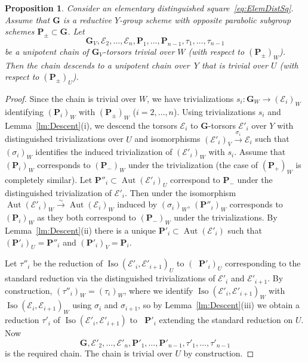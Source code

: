 \documentclass[11pt]{amsart}
\DeclareMathOperator\Ru{R_u}
\DeclareMathOperator{\Aut}{Aut}
\DeclareMathOperator{\Iso}{Iso}
\theoremstyle{plain}
\newtheorem{proposition}{Proposition}[section]
\theoremstyle{definition}
\theoremstyle{remark}
\newcommand\cE{{\mathcal{E}}}
\newcommand\bG{{\mathbf G}}
\newcommand\bP{{\mathbf P}}
\begin{document}
\begin{proposition}\label{pr:DescendChain}
Consider an elementary distinguished square~\eqref{eq:ElemDistSq}. Assume that $\bG$ is a reductive $Y$-group scheme with opposite parabolic subgroup schemes $\bP_\pm\subset\bG$. Let
\[
\bG_V,\cE_2,\ldots,\cE_n, \bP_1,\ldots,\bP_{n-1},\tau_1,\ldots,\tau_{n-1}
\]
be a unipotent chain of $\bG_V$-torsors trivial over $W$ (with respect to $(\bP_\pm)_W$). Then the chain descends to a unipotent chain over~$Y$ that is trivial over $U$ (with respect to $(\bP_\pm)_U$).
\end{proposition}
\begin{proof}
    Since the chain is trivial over $W$, we have trivializations $s_i\colon\bG_W\to(\cE_i)_W$ identifying $(\bP_i)_W$ with $(\bP_\pm)_W$ ($i=2,\ldots,n$). Using trivializations $s_i$ and Lemma~\ref{lm:Descent}(i), we descend the torsors $\cE_i$ to $\bG$-torsors $\cE'_i$ over $Y$ with distinguished trivializations over $U$ and isomorphisms $(\cE'_i)_V\xrightarrow{\sigma_i}\cE_i$ such that $(\sigma_i)_W$ identifies the induced trivialization of $(\cE'_i)_W$ with $s_i$. Assume that $(\bP_i)_W$ corresponds to $(\bP_-)_W$ under the trivialization (the case of $(\bP_+)_W$ is completely similar). Let $\bP''_i\subset\Aut(\cE'_i)_U$ correspond to $\bP_-$ under the distinguished trivialization of $\cE'_i$. Then under the isomorphism $\Aut(\cE'_i)_W\xrightarrow{\sim}\Aut(\cE_i)_W$ induced by $(\sigma_i)_W$,  $(\bP''_i)_W$ corresponds to $(\bP_i)_W$ as they both correspond to $(\bP_-)_W$ under the trivializations. By Lemma~\ref{lm:Descent}(ii) there is a unique $\bP'_i\subset\Aut(\cE'_i)$ such that $(\bP'_i)_U=\bP''_i$ and $(\bP'_i)_V=\bP_i$.

    Let $\tau''_i$ be the reduction of $\Iso(\cE'_i,\cE'_{i+1})_U$ to $(\Ru\bP'_i)_U$ corresponding to the standard reduction via the distinguished trivializations of $\cE'_i$ and $\cE'_{i+1}$. By construction, $(\tau''_i)_W=(\tau_i)_W$, where we identify $\Iso(\cE'_i,\cE'_{i+1})_W$ with $\Iso(\cE_i,\cE_{i+1})_W$ using $\sigma_i$ and $\sigma_{i+1}$, so by Lemma~\ref{lm:Descent}(iii) we obtain a reduction $\tau'_i$ of $\Iso(\cE'_i,\cE'_{i+1})$ to $\Ru\bP'_i$ extending the standard reduction on $U$. Now
    \[
        \bG,\cE'_2,\ldots,\cE'_n, \bP'_1,\ldots,\bP'_{n-1},\tau'_1,\ldots,\tau'_{n-1}
    \]
    is the required chain. The chain is trivial over $U$ by construction.
\end{proof}
\end{document}
